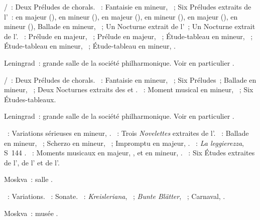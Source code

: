 \begin{description}
 \textsc{\JBach{}/\Busoni{}}~: Deux Préludes de chorals.
 \textsc{\Chopin{}}~: Fantaisie en \kF mineur, ~; Six Préludes
 extraits de l'~: en \kF \Sharp majeur (), en \kE \Flat
 mineur (), en \kD \Flat majeur (), en \kB \Flat
 mineur (), en \kA \Flat majeur (), en \kF mineur
 (), Ballade en \kF mineur, ~; Un Nocturne extrait de
 l'~; Un Nocturne extrait de l'.
 \textsc{\Rachmaninov{}}~: Prélude en \kD majeur,  ~;
 Prélude en \kG majeur,  ~; Étude-tableau en \kE \Flat
 mineur,  ~; Étude-tableau en \kG mineur, 
 ~; Étude-tableau en \kC \Sharp mineur,  .
 \item[\DateWithWeekDay{1953-03-28}]
 Leningrad~: grande salle de la société philharmonique.
 Voir en particulier \citet[p.~444]{Milshteyn82a}.

 \textsc{\JBach{}/\Busoni{}}~: Deux Préludes de chorals.
 \textsc{\Chopin{}}~: Fantaisie en \kF mineur, ~; Six Préludes~;
 Ballade en \kF mineur, ~; Deux Nocturnes extraits des  et
 .
 \textsc{\Rachmaninov{}}~: Moment musical en \kB mineur, 
 ~; Six Études-tableaux.
 \item[\DateWithWeekDay{1953-03-30}]
 Leningrad~: grande salle de la société philharmonique.
 Voir en particulier \citet[p.~444]{Milshteyn82a}.

 \textsc{\Mendelssohn{}}~: Variations sérieuses en \kD mineur, .
 \textsc{\Schumann{}}~: Trois \emph{Novelettes} extraites de l'.
 \textsc{\Chopin{}}~: Ballade en \kG mineur, ~; Scherzo en \kB
 \Flat mineur, ~; Impromptu en \kG \Flat majeur, .
 \textsc{\Liszt{}}~: \emph{La leggierezza}, S~144 .
 \textsc{\Rachmaninov{}}~: Moments musicaux en \kD \Flat majeur, 
 , et en \kE \Flat mineur,  .
 \textsc{\Scriabine{}}~: Six Études extraites de l', de l'
 et de l'.
 \item[\DateWithWeekDay{1953-04-25}]
 Moskva~: salle \Tchaikovski{}.

 \textsc{\Haendel{}}~: Variations.
 \textsc{\Haydn{}}~: Sonate.
 \textsc{\Schumann{}}~: \emph{Kreisleriana}, ~; \emph{Bunte
 Blätter}, ~; Carnaval, .
 \item[\DateWithWeekDay{1953-04-27}]
 Moskva~: musée \Scriabine{}.


\end{description}
